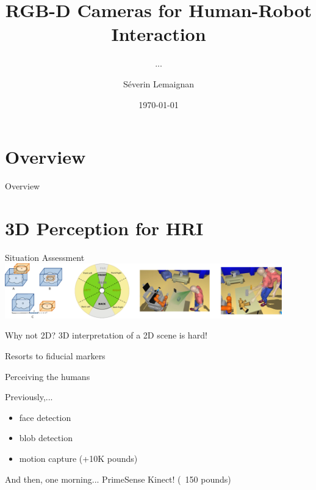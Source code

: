 \documentclass[compress]{beamer}
\title{RGB-D Cameras for Human-Robot Interaction}
\subtitle{...}
\date{\today}
\author{Séverin Lemaignan}
\institute{Centre for Neural Systems and Robotics\\{\Medium Plymouth University}}
\begin{document}

\maketitle

\section*{Overview}
\begin{frame}{Overview}
    \tableofcontents[hideallsubsections]
\end{frame}



\section{3D Perception for HRI}


\begin{frame}{Situation Assessment}
        \centering
        \\
        \vspace*{1em}
        \includegraphics[width=0.9\textwidth]{spark.pdf}
\end{frame}

\begin{frame}{Why not 2D?}
    3D interpretation of a 2D scene is hard!

    Resorts to fiducial markers
\end{frame}

\begin{frame}{Perceiving the humans}

Previously,...

\begin{itemize}
    \item face detection
    \item blob detection
    \item motion capture (+10K pounds)
\end{itemize}

And then, one morning... PrimeSense Kinect! (~150 pounds)

\end{frame}
\end{document}
